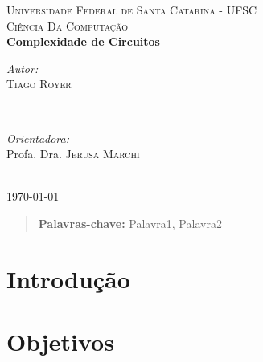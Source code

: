 \documentclass[12pt]{article}
\begin{document}
\begin{titlepage}
    \center

    \textsc{\LARGE Universidade Federal de Santa Catarina - UFSC}\\[1.5cm]
    \textsc{\Large Ciência Da Computação}\\[4cm]

    {\huge \bfseries Complexidade de Circuitos}\\[3cm]

    \hspace{400.0cm}

    \begin{minipage}{0.4\textwidth}
        \begin{flushleft} \large
        \emph{Autor:} \\ \textsc{Tiago Royer}
        \end{flushleft}
    \end{minipage}
    ~
    \begin{minipage}{0.4\textwidth}
        \begin{flushright} \large
        \emph{Orientadora:} \\ Profa. Dra. \textsc{Jerusa Marchi}
        \end{flushright}
    \end{minipage}\\[4cm]

    {\large \today}\\[3cm]

    \vfill %
\end{titlepage}

\tableofcontents
\newpage

\begin{abstract}
    \blindtext

    {\bf Palavras-chave:} Palavra1, Palavra2
\end{abstract}

\section{Introdução}

    \blindtext\cite{Sipser2006}

    \blindtext\cite{Hastad1987}

    \blindtext\cite{Sipser2006}

\section{Objetivos}
\end{document}
